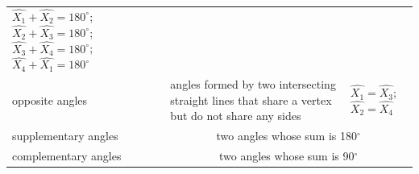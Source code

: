 {\begin{tabular}[t]{|l|l|l|}
                  $\hat{{X}_{1}}+\hat{{X}_{2}}={180}^{\circ }$;
                  $\hat{{X}_{2}}+\hat{{X}_{3}}={180}^{\circ }$;
                  $\hat{{X}_{3}}+\hat{{X}_{4}}={180}^{\circ }$;
                  $\hat{{X}_{4}}+\hat{{X}_{1}}={180}^{\circ }$
     \tabularnewline\cline{1-1}\cline{2-2}\cline{3-3}
        opposite angles &
        angles formed by two intersecting straight lines that share a vertex but do not share any sides &
                  $\hat{{X}_{1}}=\hat{{X}_{3}}$;
                  $\hat{{X}_{2}}=\hat{{X}_{4}}$
     \tabularnewline\cline{1-1}\cline{2-2}\cline{3-3}
        supplementary angles &
    \multicolumn{2}{c|}{two angles whose sum is 180${}^{\circ }$}
     \tabularnewline\cline{1-1}\cline{2-2}\cline{3-3}
        complementary angles &
    \multicolumn{2}{c|}{two angles whose sum is 90${}^{\circ }$}
     \tabularnewline\cline{1-1}\cline{2-2}\cline{3-3}
    \end{tabular}} %
